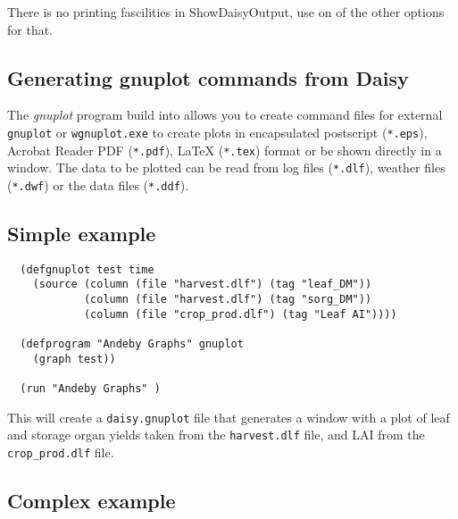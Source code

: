 \documentclass[a4paper,11pt]{article}
\begin{document}
There is no printing fascilities in ShowDaisyOutput, use on of the
other options for that. 

\subsection{Generating gnuplot commands from Daisy}
\label{sec:gnuplot-daisy}

The \emph{gnuplot} program build into \daisy{} allows you to create
command files for external \texttt{gnuplot} or \texttt{wgnuplot.exe}
to create plots in encapsulated postscript (\texttt{*.eps}), Acrobat
Reader PDF (\texttt{*.pdf}), LaTeX (\texttt{*.tex}) format or be shown
directly in a window.  The data to be plotted can be read from
\daisy{} log files (\texttt{*.dlf}), \daisy{} weather files
(\texttt{*.dwf}) or the \daisy{} data files (\texttt{*.ddf}).

\subsection{Simple example}

\begin{verbatim}
  (defgnuplot test time
    (source (column (file "harvest.dlf") (tag "leaf_DM"))
            (column (file "harvest.dlf") (tag "sorg_DM"))
            (column (file "crop_prod.dlf") (tag "Leaf AI"))))

  (defprogram "Andeby Graphs" gnuplot
    (graph test))

  (run "Andeby Graphs" )
\end{verbatim}
This will create a \texttt{daisy.gnuplot} file that generates a window
with a plot of leaf and storage organ yields taken from the
\texttt{harvest.dlf} file, and LAI from the \texttt{crop\_prod.dlf}
file.

\subsection{Complex example}
\end{document}
